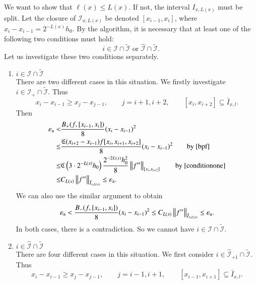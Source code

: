 \documentclass[review]{elsarticle}
\newcommand{\abstol}{\varepsilon_{\textrm{a}}}
\theoremstyle{definition}
\begin{document}
We want to show that $\ell(x) \le L(x)$. If not, the interval $I_{x,L(x)}$ must be split. Let the closure of $\mathcal{I}_{x,L(x)}$ be
denoted $[x_{i-1},x_i]$, where $x_i-x_{i-1}=2^{-L(x)}h_0$.
By the algorithm, it is necessary that at least one of the following two conditions must hold:
\[i \in \mathcal{I} \cap \widetilde{\mathcal{I}}
\text{ or } \widehat{\mathcal{I}}\cap \widetilde{\mathcal{I}}. \]
Let us investigate these two conditions separately.
\begin{enumerate}
  \item $i \in \mathcal{I} \cap \widetilde{\mathcal{I}}$\\
  There are two different cases in this situation. We firstly investigate $i \in \mathcal{I}_+ \cap \widetilde{\mathcal{I}}$.
  Thus
  \begin{equation}
  \label{conditionone} x_{i}-x_{i-1} \ge x_{j}-x_{j-1}, \qquad   j=i+1,i+2, \qquad [x_i,x_{i+2}] \subseteq \bar{I}_{x,l}.
  \end{equation}
  Then
  \begin{align*}
  \abstol < & \frac{B_+(f,[x_{i-1},x_i])}{8}(x_i-x_{i-1})^2 \\
   \le &\frac{\fC(x_{i+2}-x_{i-1})f[x_{i},x_{i+1},x_{i+2}]}{8}(x_{i}-x_{i-1})^2 \qquad \text{by } \eqref{bpf} \\
  \le & \fC\left(3\cdot2^{-L(x)}h_0\right) \frac{2^{-2L(x)}h_0^2}{8}\norm[{[x_{i},x_{i+2}]}]{f''} \qquad \text{by } \eqref{conditionone}  \\
     \le & C_{L(x)} \norm[\bar{I}_{x,L(x)}]{f''} \le \abstol.
  \end{align*}
  We can also use the similar argument to obtain
   \begin{align*}
  \abstol < \frac{B_-(f,[x_{i-1},x_i])}{8}(x_i-x_{i-1})^2  \le
      C_{L(x)} \norm[\bar{I}_{x,L(x)}]{f''} \le \abstol.
  \end{align*}
  In both cases, there is a contradiction. So we cannot have $i \in \mathcal{I} \cap \widetilde{\mathcal{I}}$.
  \item $i \in \widehat{\mathcal{I}}\cap \widetilde{\mathcal{I}}$\\
  There are four different cases in this situation. We first consider $i \in \widehat{\mathcal{I}}_{+1} \cap \widetilde{\mathcal{I}}$.
  Thus
  \begin{equation} \label{conditiontwo}
  x_{i}-x_{i-1} \ge x_{j}-x_{j-1},\qquad j=i-1,i+1, \qquad [x_{i-1},x_{i+1}] \subseteq \bar{I}_{x,l}.
  \end{equation}

\end{enumerate}
\end{document}
